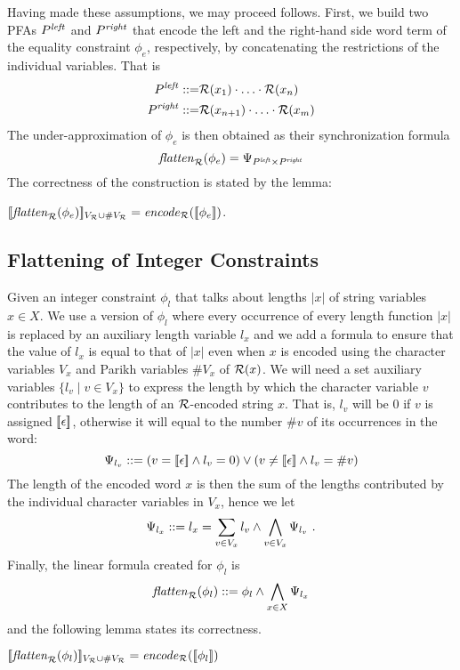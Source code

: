 \documentclass[sigplan,screen]{acmart}
\begin{document}
Having made these assumptions, we may proceed follows. First, we build two PFAs $P^{\mathit{left}}$ and $P^{\mathit{right}}$ that encode the left and the right-hand side word term of the equality constraint $\phi_e$, respectively, by concatenating the restrictions of the individual variables. That is
\begin{eqnarray*}
P^{\mathit{left}} ::=& \mathcal{R}(x_1)\cdot\ldots \cdot \mathcal{R}(x_n)\\
P^{\mathit{right}} ::=& \mathcal{R}(x_{n+1})\cdot\ldots \cdot \mathcal{R}(x_m)
\end{eqnarray*}
The under-approximation of $\phi_e$ is then obtained as their synchronization formula
$$
\mathit{flatten}_{\mathcal{R}}(\phi_e) = \Psi_{P^{\mathit{left}} \times P^{\mathit{right}}}
$$
The correctness of the construction is stated by the lemma:
\begin{lemma}\label{lemma:eqcorrect}
$[\![\mathit{flatten}_{\mathcal{R}}(\phi_e)]\!]_{V_{\mathcal{R}}  \cup \#V_{\mathcal{R}}} = \mathit{encode}_{\mathcal{R}} ([\![\phi_e]\!])$.
\end{lemma}

\subsection{Flattening of Integer Constraints}
{
\newcommand{\lx}{l_x}
\newcommand{\lv}{l_v}
Given an integer constraint $\phi_l$ that talks about lengths $|x|$ of string variables $x\in X$. 
We use a version of $\phi_l$ where every occurrence of every length function $|x|$ is replaced by an auxiliary length variable $\lx$ and we add a formula to ensure that the value of $\lx$ is equal to that of $|x|$ even when $x$ is encoded using the character variables $V_x$ and Parikh variables $\# V_x$ of $\mathcal{R}(x)$.
%
We will need a set auxiliary variables $\{l_v\mid v\in V_x\}$ to express the length by which the character variable $v$ contributes to the length of an $\mathcal{R}$-encoded string $x$. 
That is, $\lv$ will be $0$ if $v$ is assigned $[\![\epsilon]\!]$,
otherwise it will equal to the number $\#v$ of its occurrences in the word:
$$
\Psi_{\lv} \defeq (v = \noepsilon \land l_v=0) \lor (v \neq \noepsilon \land l_v = \# v)
$$
The length of the encoded word $x$ is then the sum of the lengths contributed by the individual character variables in $V_x$, 
hence we let 
$$
\Psi_{\lx} \defeq \lx = \sum_{v\in V_x} l_v \land  \bigwedge_{v\in V_x} \Psi_{\lv}\ .
$$
Finally, the linear formula created for $\phi_l$ is 
$$
\underf \dr {\phi_{l}} \defeq \phi_l \land \bigwedge_{x\in X} \Psi_{\lx}
$$
and the following lemma states its correctness.
}
\begin{lemma}\label{lemma:eqcorrect}
$[\![\mathit{flatten}_{\mathcal{R}}(\phi_l)]\!]_{V_{\mathcal{R}}  \cup \#V_{\mathcal{R}}} = \mathit{encode}_{\mathcal{R}} ([\![\phi_l]\!])$
\end{lemma}
\end{document}
